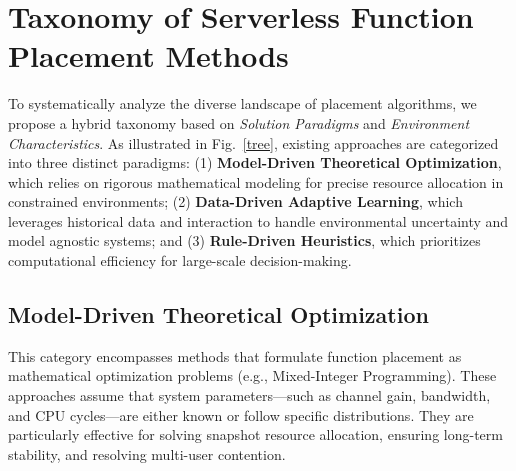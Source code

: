 \documentclass[lettersize,journal]{IEEEtran}
\begin{document}
\section{Taxonomy of Serverless Function Placement Methods}
\label{sec:taxonomy}
To systematically analyze the diverse landscape of placement algorithms, we propose a hybrid taxonomy based on \textit{Solution Paradigms} and \textit{Environment Characteristics}. As illustrated in Fig.~\ref{tree}, existing approaches are categorized into three distinct paradigms: (1) \textbf{Model-Driven Theoretical Optimization}, which relies on rigorous mathematical modeling for precise resource allocation in constrained environments; (2) \textbf{Data-Driven Adaptive Learning}, which leverages historical data and interaction to handle environmental uncertainty and model agnostic systems; and (3) \textbf{Rule-Driven Heuristics}, which prioritizes computational efficiency for large-scale decision-making.

\subsection{Model-Driven Theoretical Optimization}
This category encompasses methods that formulate function placement as mathematical optimization problems (e.g., Mixed-Integer Programming). These approaches assume that system parameters---such as channel gain, bandwidth, and CPU cycles---are either known or follow specific distributions. They are particularly effective for solving snapshot resource allocation, ensuring long-term stability, and resolving multi-user contention.
\end{document}
